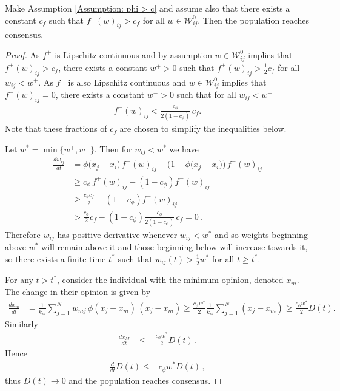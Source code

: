 \documentclass{article}
\begin{document}
\begin{proposition} \label{Prop: edge creating dynamics}
    Make Assumption \ref{Assumption: phi > c} and assume also that there exists a constant $c_f$ such that $f^+(w)_{ij} > c_f$ for all $w \in \mathcal{W}_{ij}^0$. Then the population reaches consensus. 
\end{proposition}
\begin{proof}
    As $f^+$ is Lipschitz continuous and by assumption $w\in \mathcal{W}_{ij}^0$ implies that $f^+(w)_{ij}>c_f$, there exists a constant $w^+>0$ such that $f^+(w)_{ij}>\frac{1}{2}c_f$ for all $w_{ij}<w^+$. 
    As $f^-$ is also Lipschitz continuous and $w\in \mathcal{W}_{ij}^0$ implies that $f^-(w)_{ij}=0$, there exists a constant $w^->0$ such that for all $w_{ij}<w^-$
    \begin{align*}
        f^-(w)_{ij} < \frac{c_\phi}{2(1 - c_\phi)} \, c_f.
    \end{align*} 
    Note that these fractions of $c_f$ are chosen to simplify the inequalities below. 
    
    Let $w^* = \min\{w^+,w^-\}$. Then for $w_{ij} < w^*$ we have 
    \begin{align*}
        \frac{dw_{ij}}{dt}
        &= \phi\big(x_j - x_i\big)\, f^+(w)_{ij} - \Big(1 - \phi\big(x_j - x_i\big)\Big)\, f^-(w)_{ij} \\
        &\geq c_\phi\, f^+(w)_{ij} - (1-c_\phi) f^-(w)_{ij} \\
        &\geq \frac{c_\phi c_f}{2} - (1-c_\phi) f^-(w)_{ij} \\
        &> \frac{c_\phi}{2} c_f - (1-c_\phi) \frac{c_\phi}{2(1 - c_\phi)} \, c_f 
        = 0 \,.
    \end{align*}
    Therefore $w_{ij}$ has positive derivative whenever $w_{ij}<w^*$ and so weights beginning above $w^*$ will remain above it and those beginning below will increase towards it, so there exists a finite time $t^*$ such that $w_{ij}(t)>\frac{1}{2}w^*$ for all $t\geq t^*$. 

    For any $t>t^*$, consider the individual with the minimum opinion, denoted $x_m$. The change in their opinion is given by
    \begin{align*}
        \frac{dx_m}{dt} 
        &= \frac{1}{k_m} \sum_{j=1}^N w_{mj}\,\phi(x_j - x_m)\,(x_j - x_m) 
        \geq \frac{c_\phi w^*}{2}\frac{1}{k_m} \sum_{j=1}^N (x_j - x_m) 
        \geq \frac{c_\phi w^*}{2} D(t).
    \end{align*}
    Similarly 
    \begin{align*}
        \frac{dx_M}{dt} 
        &\leq -\frac{c_\phi w^*}{2} D(t) \,.
    \end{align*}
    Hence 
    \begin{align*}
        \frac{d}{dt}D(t) \leq -c_\phi w^* D(t) \,,
    \end{align*}
    thus $D(t)\rightarrow0$ and the population reaches consensus. 
\end{proof}
\end{document}
